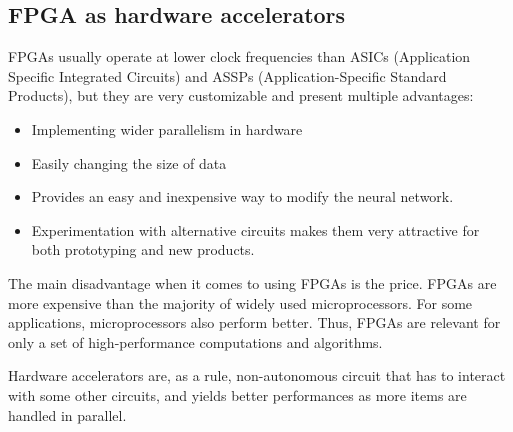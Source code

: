 \subsection{FPGA as hardware accelerators}
FPGAs usually operate at lower clock frequencies than ASICs (Application Specific Integrated Circuits) and ASSPs (Application-Specific Standard Products), but they are very customizable and present multiple advantages:
\begin{itemize}
    \item Implementing wider parallelism in hardware
    \item Easily changing the size of data
    \item Provides an easy and inexpensive way to modify the neural network.
    \item Experimentation with alternative circuits makes them very attractive for both prototyping and new products.
\end{itemize}
The main disadvantage when it comes to using FPGAs is the price. FPGAs are more expensive than the majority of widely used microprocessors. For some applications, microprocessors also perform better. Thus, FPGAs are relevant for only a set of high-performance computations and algorithms.

Hardware accelerators are, as a rule, non-autonomous circuit that has to interact with some other circuits, and yields better performances as more items are handled in parallel.